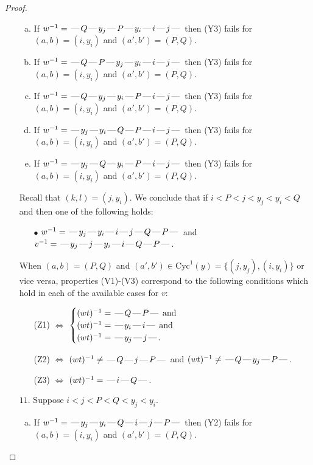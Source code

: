 \documentclass[10pt]{article}
\theoremstyle{definition}
\theoremstyle{definition}
\def\dash{\text{\hspace{0.5mm}---\hspace{0.5mm}}}
\def\Cyc{\mathrm{Cyc}}
\begin{document}
\begin{proof}
\begin{enumerate}
\begin{enumerate}[(a)]
\item If $w^{-1} = \dash Q\dash y_j\dash P\dash y_i\dash i\dash j\dash $ then (Y3) fails for $(a,b)=(i,y_i)$ and $(a',b')=(P,Q)$.
\item If $w^{-1} = \dash Q\dash P\dash y_j\dash y_i\dash i\dash j\dash $ then (Y3) fails for $(a,b)=(i,y_i)$ and $(a',b')=(P,Q)$.
\item If $w^{-1} = \dash Q\dash y_j\dash y_i\dash P\dash i\dash j\dash $ then (Y3) fails for $(a,b)=(i,y_i)$ and $(a',b')=(P,Q)$.
\item If $w^{-1} = \dash y_j\dash y_i\dash Q\dash P\dash i\dash j\dash $ then (Y3) fails for $(a,b)=(i,y_i)$ and $(a',b')=(P,Q)$.
\item If $w^{-1} = \dash y_j\dash Q\dash y_i\dash P\dash i\dash j\dash $ then (Y3) fails for $(a,b)=(i,y_i)$ and $(a',b')=(P,Q)$.
\end{enumerate}
Recall that $(k,l) = (j,y_i)$.
We conclude that if $i < P < j < y_j < y_i < Q$ and then one of the following holds:
\begin{enumerate}
\item[$\bullet$] $w^{-1} = \dash y_j\dash y_i\dash i\dash j\dash Q\dash P\dash $ and $v^{-1} = \dash y_j\dash j\dash y_i\dash i\dash Q\dash P\dash $.
\end{enumerate}
When $(a,b)= (P,Q)$ and $(a',b')\in \Cyc^1(y)=\{(j,y_j),(i,y_i)\}$ or vice versa,
properties (V1)-(V3) correspond to the following conditions which hold in
each of the available cases for $v$:
\begin{enumerate}
\item[](Z1) $\Leftrightarrow$ $\begin{cases}\text{$(wt)^{-1} = \dash Q \dash P \dash$}\text{ and }\\
\text{$(wt)^{-1} = \dash y_i \dash i \dash$}\text{ and }\\
\text{$(wt)^{-1} = \dash y_j \dash j \dash$}.\end{cases}$
\item[](Z2) $\Leftrightarrow$ $(wt)^{-1} \neq \dash Q \dash j \dash P \dash$ and $(wt)^{-1}\neq \dash Q \dash y_j \dash P \dash$.
\item[](Z3) $\Leftrightarrow$ $(wt)^{-1} = \dash i \dash Q \dash$.
\end{enumerate}
\item[$11$.] Suppose $i < j < P < Q < y_j < y_i$.
\begin{enumerate}[(a)]
\item If $w^{-1} = \dash y_j\dash y_i\dash Q\dash i\dash j\dash P\dash $ then (Y2) fails for $(a,b)=(i,y_i)$ and $(a',b')=(P,Q)$.

\end{enumerate}
\end{enumerate}
\end{proof}
\end{document}
